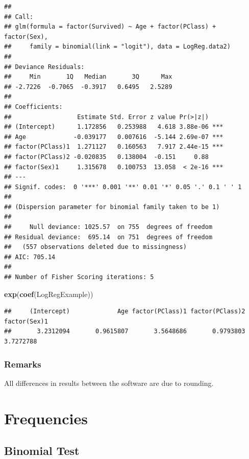 \documentclass[
]{book}
\newenvironment{Shaded}{\begin{snugshade}}{\end{snugshade}}
\newcommand{\KeywordTok}[1]{\textcolor[rgb]{0.13,0.29,0.53}{\textbf{#1}}}
\newcommand{\NormalTok}[1]{#1}
\begin{document}
\begin{verbatim}
## 
## Call:
## glm(formula = factor(Survived) ~ Age + factor(PClass) + factor(Sex), 
##     family = binomial(link = "logit"), data = LogReg.data2)
## 
## Deviance Residuals: 
##     Min       1Q   Median       3Q      Max  
## -2.7226  -0.7065  -0.3917   0.6495   2.5289  
## 
## Coefficients:
##                  Estimate Std. Error z value Pr(>|z|)    
## (Intercept)      1.172856   0.253988   4.618 3.88e-06 ***
## Age             -0.039177   0.007616  -5.144 2.69e-07 ***
## factor(PClass)1  1.271127   0.160563   7.917 2.44e-15 ***
## factor(PClass)2 -0.020835   0.138004  -0.151     0.88    
## factor(Sex)1     1.315678   0.100753  13.058  < 2e-16 ***
## ---
## Signif. codes:  0 '***' 0.001 '**' 0.01 '*' 0.05 '.' 0.1 ' ' 1
## 
## (Dispersion parameter for binomial family taken to be 1)
## 
##     Null deviance: 1025.57  on 755  degrees of freedom
## Residual deviance:  695.14  on 751  degrees of freedom
##   (557 observations deleted due to missingness)
## AIC: 705.14
## 
## Number of Fisher Scoring iterations: 5
\end{verbatim}

\begin{Shaded}
\begin{Highlighting}[]
\KeywordTok{exp}\NormalTok{(}\KeywordTok{coef}\NormalTok{(LogRegExample))}
\end{Highlighting}
\end{Shaded}

\begin{verbatim}
##     (Intercept)             Age factor(PClass)1 factor(PClass)2    factor(Sex)1 
##       3.2312094       0.9615807       3.5648686       0.9793803       3.7272788
\end{verbatim}

\hypertarget{remarks-2}{%
\subsection{Remarks}\label{remarks-2}}

All differences in results between the software are due to rounding.

\hypertarget{frequencies}{%
\chapter{Frequencies}\label{frequencies}}

\hypertarget{binomial-test}{%
\section{Binomial Test}\label{binomial-test}}
\end{document}
